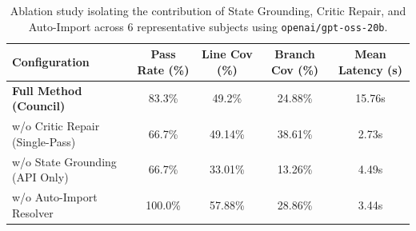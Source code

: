 \begin{table}[t]
\centering
\small
\caption{Ablation study isolating the contribution of State Grounding, Critic Repair, and Auto-Import across 6 representative subjects using \texttt{openai/gpt-oss-20b}.}
\label{tab:ablation_study}
\begin{tabular}{l c c c c}
\toprule
\textbf{Configuration} & \textbf{Pass Rate (\%)} & \textbf{Line Cov (\%)} & \textbf{Branch Cov (\%)} & \textbf{Mean Latency (s)} \\
\midrule
\textbf{Full Method (Council)} & 83.3\% & 49.2\% & 24.88\% & 15.76s \\
w/o Critic Repair (Single-Pass) & 66.7\% & 49.14\% & 38.61\% & 2.73s \\
w/o State Grounding (API Only) & 66.7\% & 33.01\% & 13.26\% & 4.49s \\
w/o Auto-Import Resolver & 100.0\% & 57.88\% & 28.86\% & 3.44s \\
\bottomrule
\end{tabular}
\end{table}